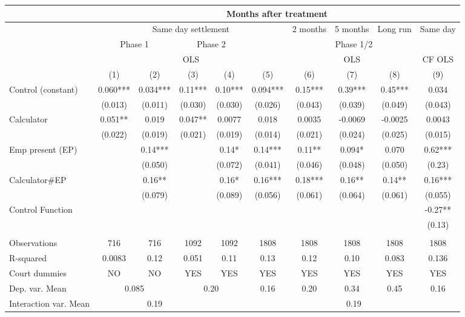 \begin{tabular}{lccccccccc}
\toprule
\multicolumn{1}{|r}{} & \multicolumn{9}{c}{Months after treatment} \\
\midrule
\multicolumn{1}{r|}{} & \multicolumn{5}{c|}{Same day settlement} & \multicolumn{1}{c|}{2 months } & \multicolumn{1}{c|}{ 5 months} & \multicolumn{1}{c|}{Long run} & Same day  \\
\midrule
\midrule
\multicolumn{1}{r|}{} & \multicolumn{2}{c|}{Phase 1} & \multicolumn{2}{c|}{Phase 2} & \multicolumn{5}{c}{Phase 1/2} \\
\midrule
\multicolumn{1}{r|}{} & \multicolumn{5}{c|}{OLS}              & \multicolumn{3}{c|}{OLS} & CF OLS \\
\midrule
\midrule
      & (1)   & (2)   & (3)   & (4)   & (5)   & (6)   & (7)   & (8)   & (9) \\
Control (constant) & 0.060*** & 0.034*** & 0.11*** & 0.10*** & 0.094*** & 0.15*** & 0.39*** & 0.45*** & 0.034 \\
      & (0.013) & (0.011) & (0.030) & (0.030) & (0.026) & (0.043) & (0.039) & (0.049) & (0.043) \\
Calculator & 0.051** & 0.019 & 0.047** & 0.0077 & 0.018 & 0.0035 & -0.0069 & -0.0025 & 0.0043 \\
      & (0.022) & (0.019) & (0.021) & (0.019) & (0.014) & (0.021) & (0.024) & (0.025) & (0.015) \\
Emp present (EP) &       & 0.14*** &       & 0.14* & 0.14*** & 0.11** & 0.094* & 0.070 & 0.62*** \\
      &       & (0.050) &       & (0.072) & (0.041) & (0.046) & (0.048) & (0.050) & (0.23) \\
Calculator\#EP &       & 0.16** &       & 0.16* & 0.16*** & 0.18*** & 0.16** & 0.14** & 0.16*** \\
      &       & (0.079) &       & (0.089) & (0.056) & (0.061) & (0.064) & (0.061) & (0.055) \\
Control Function &       &       &       &       &       &       &       &       & -0.27** \\
      &       &       &       &       &       &       &       &       & (0.13) \\
      &       &       &       &       &       &       &       &       &  \\
\midrule
Observations & 716   & 716   & 1092  & 1092  & 1808  & 1808  & 1808  & 1808  & 1808 \\
R-squared & 0.0083 & 0.12  & 0.051 & 0.11  & 0.13  & 0.12  & 0.10  & 0.083 & 0.136 \\
Court dummies  & NO    & NO    & YES   & YES   & YES   & YES   & YES   & YES   & YES \\
Dep. var. Mean & \multicolumn{2}{c}{0.085} & \multicolumn{2}{c}{0.20} & 0.16  & 0.20  & 0.34  & 0.45  & 0.16 \\
Interaction var. Mean &       & 0.19  &       &       & \multicolumn{5}{c}{0.19} \\
\bottomrule
\bottomrule
\end{tabular}%

